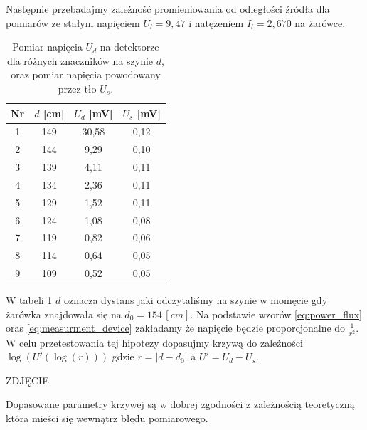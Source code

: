\documentclass[12pt]{article}
\begin{document}
Następnie przebadajmy zależność promieniowania od odległości źródła dla pomiarów ze stałym napięciem $U_l = 9{,}47$ i natężeniem $I_l = 2{,}670$ na żarówce.
\begin{table}[H]
    \centering
    \begin{tabular}{c|c|c|c}
        \toprule
        Nr & $d$ [cm] & $U_d$ [mV] & $U_s$ [mV] \\
        \midrule
        1 & 149 & 30{,}58 & 0{,}12 \\
        2 & 144 & 9{,}29  & 0{,}10 \\
        3 & 139 & 4{,}11  & 0{,}11 \\
        4 & 134 & 2{,}36  & 0{,}11 \\
        5 & 129 & 1{,}52  & 0{,}11 \\
        6 & 124 & 1{,}08  & 0{,}08 \\
        7 & 119 & 0{,}82  & 0{,}06 \\
        8 & 114 & 0{,}64  & 0{,}05 \\
        9 & 109 & 0{,}52  & 0{,}05 \\
        \bottomrule
    \end{tabular}
    \caption{Pomiar napięcia $U_d$ na detektorze dla różnych znaczników na szynie $d$, oraz pomiar napięcia powodowany przez tło $U_s$.}
    \label{tab:distance_measurements}
\end{table}
W tabeli \ref{tab:distance_measurements} $d$ oznacza dystans jaki odczytaliśmy na szynie w momęcie gdy żarówka znajdowała się na $d_0 = 154 \, [cm]$.
Na podstawie wzorów \eqref{eq:power_flux} oras \eqref{eq:measurment_device} zakładamy że napięcie będzie proporcjonalne do $\frac{1}{r^2}$. 
W celu przetestowania tej hipotezy dopasujmy krzywą do zależności $\log(U'(\log(r)))$ gdzie $r = |d-d_0|$ a $U' = U_d - \bar{U_s}$.

ZDJĘCIE

Dopasowane parametry krzywej są w dobrej zgodności z zależnością teoretyczną która mieści się wewnątrz błędu pomiarowego.
\end{document}

